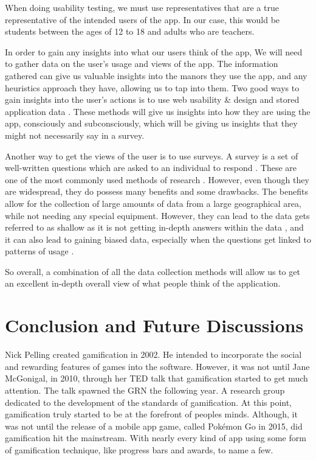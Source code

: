 \documentclass[sigchi]{acmart}
\begin{document}
When doing usability testing, we must use representatives that are a true representative of the intended users of the app. In our case, this would be students between the ages of 12 to 18 and adults who are teachers. 

In order to gain any insights into what our users think of the app, We will need to gather data on the user's usage and views of the app. The information gathered can give us valuable insights into the manors they use the app, and any heuristics approach they have, allowing us to tap into them. Two good ways to gain insights into the user's actions is to use web usability \& design and stored application data \cite{datacollectionlecture}. These methods will give us insights into how they are using the app, consciously and subconsciously, which will be giving us insights that they might not necessarily say in a survey.

Another way to get the views of the user is to use surveys. A survey is a set of well-written questions which are asked to an individual to respond \cite{surveylecture}. These are one of the most commonly used methods of research \cite{lazar2017research}. However, even though they are widespread, they do possess many benefits and some drawbacks. The benefits allow for the collection of large amounts of data from a large geographical area, while not needing any special equipment. However, they can lead to the data gets referred to as shallow as it is not getting in-depth answers within the data \cite{surveylecture}, and it can also lead to gaining biased data, especially when the questions get linked to patterns of usage \cite{lazar2017research}.

So overall, a combination of all the data collection methods will allow us to get an excellent in-depth overall view of what people think of the application.

\section{Conclusion and Future Discussions}
Nick Pelling created gamification in 2002. He intended to incorporate the social and rewarding features of games into the software. However, it was not until Jane McGonigal, in 2010, through her TED talk that gamification started to get much attention. The talk spawned the GRN the following year. A research group dedicated to the development of the standards of gamification. At this point, gamification truly started to be at the forefront of peoples minds. Although, it was not until the release of a mobile app game, called Pokémon Go in 2015, did gamification hit the mainstream. With nearly every kind of app using some form of gamification technique, like progress bars and awards, to name a few.
\end{document}
